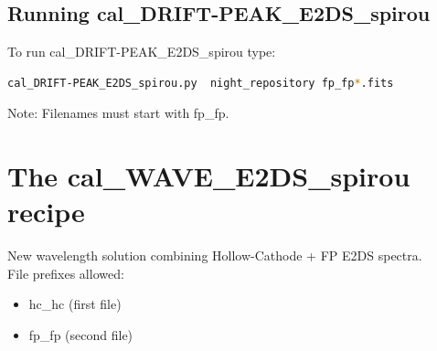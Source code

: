 \subsection{Running cal\_DRIFT-PEAK\_E2DS\_spirou}

To run cal\_DRIFT-PEAK\_E2DS\_spirou type:
\begin{lstlisting}[language=bash, style=bashstyle]
cal_DRIFT-PEAK_E2DS_spirou.py  night_repository fp_fp*.fits
\end{lstlisting}

\noindent Note: Filenames must start with fp\_fp.







\clearpage
\newpage
\section{The cal\_WAVE\_E2DS\_spirou recipe}
\label{section:cal_WAVE_E2DS_spirou}

New wavelength solution combining Hollow-Cathode + FP E2DS spectra. \\


\noindent File prefixes allowed:
\begin{itemize}
	\item hc\_hc (first file)
	\item fp\_fp (second file)
\end{itemize}

